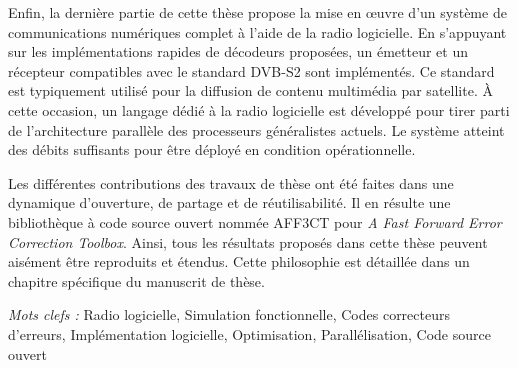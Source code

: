Enfin, la dernière partie de cette thèse propose la mise en œuvre d'un système
de communications numériques complet à l'aide de la radio logicielle. En
s’appuyant sur les implémentations rapides de décodeurs proposées, un émetteur
et un récepteur compatibles avec le standard DVB-S2 sont implémentés. Ce
standard est typiquement utilisé pour la diffusion de contenu multimédia par
satellite. À cette occasion, un langage dédié à la radio logicielle est
développé pour tirer parti de l'architecture parallèle des processeurs
généralistes actuels. Le système atteint des débits suffisants pour être déployé
en condition opérationnelle.

Les différentes contributions des travaux de thèse ont été faites dans une
dynamique d'ouverture, de partage et de réutilisabilité. Il en résulte une
bibliothèque à code source ouvert nommée AFF3CT pour \emph{A Fast Forward Error
Correction Toolbox}. Ainsi, tous les résultats proposés dans cette thèse peuvent
aisément être reproduits et étendus. Cette philosophie est détaillée dans un
chapitre spécifique du manuscrit de thèse.

\vskip0.5cm
\emph{Mots clefs :} Radio logicielle, Simulation fonctionnelle, Codes
                    correcteurs d'erreurs, Implémentation logicielle,
                    Optimisation, Parallélisation, Code source ouvert
